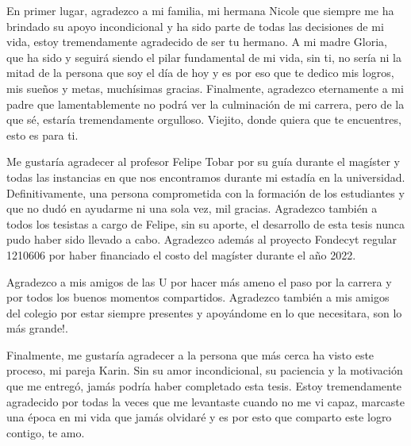 \documentclass[
	spanish, %
	letterpaper, oneside
]{book}
\begin{document}
\begin{acknowledgments}

En primer lugar, agradezco a mi familia, mi hermana Nicole que siempre me ha brindado su apoyo incondicional y ha sido parte de todas las decisiones de mi vida, estoy tremendamente agradecido de ser tu hermano. A mi madre Gloria, que ha sido y seguirá siendo el pilar fundamental de mi vida, sin ti, no sería ni la mitad de la persona que soy el día de hoy y es por eso que te dedico mis logros, mis sueños y metas, muchísimas gracias. Finalmente, agradezco eternamente a mi padre que lamentablemente no podrá ver la culminación de mi carrera, pero de la que sé, estaría tremendamente orgulloso. Viejito, donde quiera que te encuentres, esto es para ti. 

\vspace{0.2cm}

Me gustaría agradecer al profesor Felipe Tobar por su guía durante el magíster y todas las instancias en que nos encontramos durante mi estadía en la universidad. Definitivamente, una persona comprometida con la formación de los estudiantes y que no dudó en ayudarme ni una sola vez, mil gracias. Agradezco también a todos los tesistas a cargo de Felipe, sin su aporte, el desarrollo de esta tesis nunca pudo haber sido llevado a cabo. Agradezco además al proyecto Fondecyt regular 1210606 por haber financiado el costo del magíster durante el año 2022.

\vspace{0.2cm}

Agradezco a mis amigos de las U por hacer más ameno el paso por la carrera y por todos los buenos momentos compartidos. Agradezco también a mis amigos del colegio por estar siempre presentes y apoyándome en lo que necesitara, son lo más grande!. 

\vspace{0.2cm}

Finalmente, me gustaría agradecer a la persona que más cerca ha visto este proceso, mi pareja Karin. Sin su amor incondicional, su paciencia y la motivación que me entregó, jamás podría haber completado esta tesis. Estoy tremendamente agradecido por todas la veces que me levantaste cuando no me vi capaz, marcaste una época en mi vida que jamás olvidaré y es por esto que comparto este logro contigo, te amo. 


\end{acknowledgments}

\templateIndex
\end{document}
